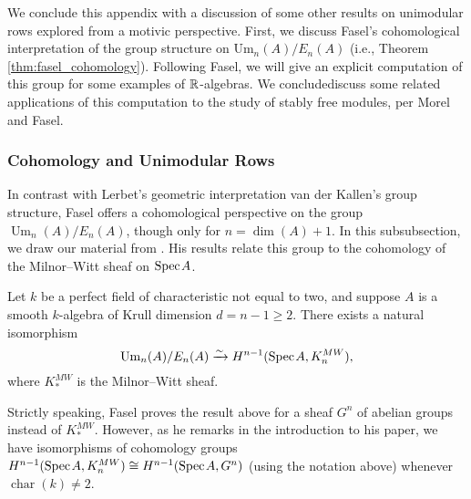 We conclude this appendix with a discussion of some other results on unimodular rows explored from a motivic perspective. First, we discuss Fasel's cohomological interpretation of the group structure on $\mathrm{Um}_n(A)/E_n(A)$ (i.e., Theorem \ref{thm:fasel_cohomology}). Following Fasel, we will give an explicit computation of this group for some examples of $\mathbb{R}$-algebras. We concludediscuss some related applications of this computation to the study of stably free modules, per Morel and Fasel. 

\subsubsection{Cohomology and Unimodular Rows} In contrast with Lerbet's geometric interpretation van der Kallen's group structure, Fasel offers a cohomological perspective on the group $\operatorname{Um}_n(A)/E_n(A)$, though only for $n = \dim(A) + 1$. In this subsubsection, we draw our material from \cite[Sections 3, 4]{Fasel-unim}. His results relate this group to the cohomology of the Milnor--Witt sheaf on $\text{Spec}\hspace{0.1em} A$.

\begin{theorem}\cite[Theorem 4.9]{Fasel-unim}
    Let $k$ be a perfect field of characteristic not equal to two, and suppose $A$ is a smooth $k$-algebra of Krull dimension $d = n-1 \geq 2$. There exists a natural isomorphism 
    \[
    \mathrm{Um}_n(A)/E_n(A) \xrightarrow{\sim} H^{n-1}(\text{Spec}\hspace{0.1em} A,K_{n}^{MW}),
    \]
    where $K_*^{MW}$ is the Milnor--Witt sheaf.
\end{theorem}

\begin{remark}
    Strictly speaking, Fasel proves the result above for a sheaf $G^{n}$ of abelian groups instead of $K_*^{MW}$. However, as he remarks in the introduction to his paper, we have isomorphisms of cohomology groups $H^{n-1}(\text{Spec}\hspace{0.1em} A, K_n^{MW}) \cong H^{n-1}(\text{Spec}\hspace{0.1em} A, G^n)$ (using the notation above) whenever $\operatorname{char}(k) \neq 2$.
\end{remark}

